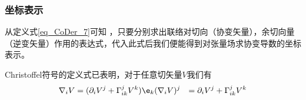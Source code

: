 \subsubsection{坐标表示}
从定义式\autoref{eq_CoDer_7}可知 ，只要分别求出联络对切向（协变矢量），余切向量（逆变矢量）作用的表达式，代入此式后我们便能得到对张量场求协变导数的坐标表示。

Christoffel符号的定义式已表明，对于任意切矢量$V$我们有
\begin{equation}
\begin{aligned}
\nabla_i V&=(\partial_iV^j+\Gamma^j_{ik}V^k)\e_k
(\nabla_i V)^j&=\partial_iV^j+\Gamma^j_{ik}V^k
\end{aligned}
\end{equation}







